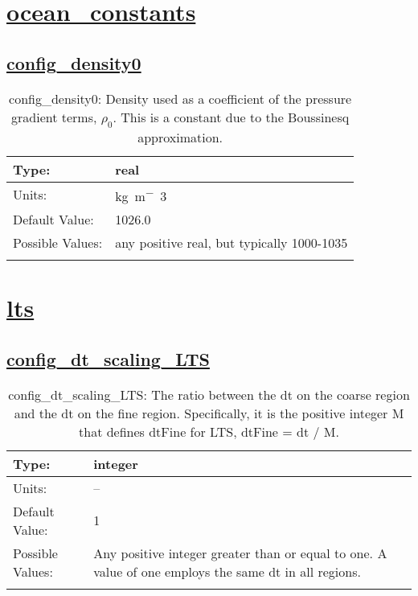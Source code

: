 \section[ocean\_constants]{\hyperref[sec:nm_tab_ocean_constants]{ocean\_constants}}
\label{sec:nm_sec_ocean_constants}
\subsection[config\_density0]{\hyperref[sec:nm_tab_ocean_constants]{config\_density0}}
\label{subsec:nm_sec_config_density0}
\begin{center}
\begin{longtable}{| p{2.0in} || p{4.0in} |}
    \hline
    Type: & real \\
    \hline
    Units: & \si{kg.m^-3} \\
    \hline
    Default Value: & 1026.0 \\
    \hline
    Possible Values: & any positive real, but typically 1000-1035 \\
    \hline
    \caption{config\_density0: Density used as a coefficient of the pressure gradient terms, $\rho_0$. This is a constant due to the Boussinesq approximation.}
\end{longtable}
\end{center}
\section[lts]{\hyperref[sec:nm_tab_lts]{lts}}
\label{sec:nm_sec_lts}
\subsection[config\_dt\_scaling\_LTS]{\hyperref[sec:nm_tab_lts]{config\_dt\_scaling\_LTS}}
\label{subsec:nm_sec_config_dt_scaling_LTS}
\begin{center}
\begin{longtable}{| p{2.0in} || p{4.0in} |}
    \hline
    Type: & integer \\
    \hline
    Units: & -- \\
    \hline
    Default Value: & 1 \\
    \hline
    Possible Values: & Any positive integer greater than or equal to one. A value of one employs the same dt in all regions. \\
    \hline
    \caption{config\_dt\_scaling\_LTS: The ratio between the dt on the coarse region and the dt on the fine region. Specifically, it is the positive integer M that defines dtFine for LTS, dtFine = dt / M.}
\end{longtable}
\end{center}
